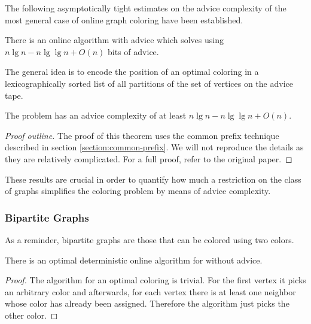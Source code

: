 The following asymptotically tight estimates on the advice complexity of
the most general case of online graph coloring have been established.

\begin{theorem}\label{theorem:general-graphs-upper}
    There is an online algorithm with advice which solves
     using $n \lg n - n \lg\lg n + O(n)$ bits of
    advice.
\end{theorem}

The general idea is to encode the position of an optimal coloring in a
lexicographically sorted list of all partitions of the set of vertices on
the advice tape.

\begin{theorem}\label{theorem:general-graphs-lower}
    The  problem has an advice complexity of at least
    $n \lg n - n \lg\lg n + O(n)$.
\end{theorem}

\begin{proof}[Proof outline]
    The proof of this theorem uses the common prefix technique described
    in section \ref{section:common-prefix}. We will not reproduce the
    details as they are relatively complicated. For a full proof, refer to
    the original paper.
\end{proof}

These results are crucial in order to quantify how much a restriction on
the class of graphs simplifies the coloring problem by means of advice
complexity.

\subsubsection{Bipartite Graphs}

As a reminder, bipartite graphs are those that can be colored using two
colors.

\begin{theorem}\label{theorem:bipartite-connected}
    There is an optimal deterministic online algorithm for
     without advice.
\end{theorem}

\begin{proof}
    The algorithm for an optimal coloring is trivial. For the first vertex
    it picks an arbitrary color and afterwards, for each vertex there is
    at least one neighbor whose color has already been assigned. Therefore
    the algorithm just picks the other color.
\end{proof}

